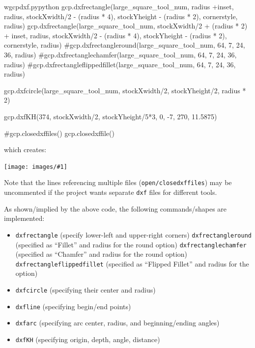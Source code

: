 \documentclass{ltxdoc}
\newcommand{\includeimage}[1]{\bigskip\noindent\texttt{[image: images/\#1]}\bigskip}
\begin{document}
\begin{writecode}{w}{gcpdxf.py}{python}
gcp.dxfrectangle(large_square_tool_num, radius +inset, radius, stockXwidth/2 - (radius * 4), stockYheight - (radius * 2), cornerstyle, radius) 
gcp.dxfrectangle(large_square_tool_num, stockXwidth/2 + (radius * 2) + inset, radius, stockXwidth/2 - (radius * 4), stockYheight - (radius * 2), cornerstyle, radius) 
#gcp.dxfrectangleround(large_square_tool_num, 64, 7, 24, 36, radius)
#gcp.dxfrectanglechamfer(large_square_tool_num, 64, 7, 24, 36, radius)
#gcp.dxfrectangleflippedfillet(large_square_tool_num, 64, 7, 24, 36, radius)

gcp.dxfcircle(large_square_tool_num, stockXwidth/2, stockYheight/2, radius * 2)

gcp.dxfKH(374, stockXwidth/2, stockYheight/5*3, 0, -7, 270, 11.5875)

#gcp.closedxffiles()
gcp.closedxffile()

\end{writecode}
\addtocounter{gcpdxfpy}{40}

\noindent which creates:

\bigskip

\includeimage{gcpdxf.pdf}

\bigskip

\noindent Note that the lines referencing multiple files (\verb|open/closedxffiles|) may be uncommented if the project wants separate \verb|dxf| files for different tools.

As shown/implied by the above code, the following commands/shapes are implemented:

\begin{itemize}
\item \verb|dxfrectangle| (specify lower-left and upper-right corners)
\subitem\verb|dxfrectangleround| (specified as ``Fillet'' and radius for the round option)
\subitem\verb|dxfrectanglechamfer| (specified as ``Chamfer'' and radius for the round option)
\subitem\verb|dxfrectangleflippedfillet| (specified as ``Flipped Fillet'' and radius for the option)
\item \verb|dxfcircle| (specifying their center and radius)
\item \verb|dxfline| (specifying begin/end points)
\item \verb|dxfarc| (specifying arc center, radius, and beginning/ending angles)
\item \verb|dxfKH| (specifying origin, depth, angle, distance)
 \end{itemize}

\end{document}
